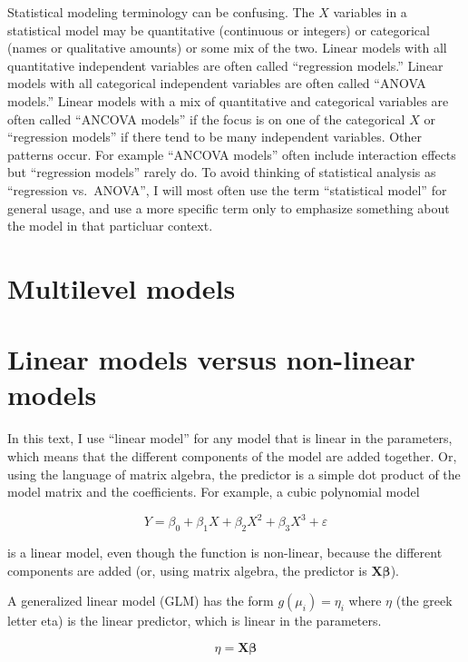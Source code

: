 \documentclass[]{book}
\theoremstyle{definition}
\theoremstyle{definition}
\theoremstyle{definition}
\theoremstyle{remark}
\begin{document}
Statistical modeling terminology can be confusing. The \(X\) variables
in a statistical model may be quantitative (continuous or integers) or
categorical (names or qualitative amounts) or some mix of the two.
Linear models with all quantitative independent variables are often
called ``regression models.'' Linear models with all categorical
independent variables are often called ``ANOVA models.'' Linear models
with a mix of quantitative and categorical variables are often called
``ANCOVA models'' if the focus is on one of the categorical \(X\) or
``regression models'' if there tend to be many independent variables.
Other patterns occur. For example ``ANCOVA models'' often include
interaction effects but ``regression models'' rarely do. To avoid
thinking of statistical analysis as ``regression vs.~ANOVA'', I will
most often use the term ``statistical model'' for general usage, and use
a more specific term only to emphasize something about the model in that
particluar context.

\section{Multilevel models}\label{multilevel-models}

\section{Linear models versus non-linear
models}\label{linear-models-versus-non-linear-models}

In this text, I use ``linear model'' for any model that is linear in the
parameters, which means that the different components of the model are
added together. Or, using the language of matrix algebra, the predictor
is a simple dot product of the model matrix and the coefficients. For
example, a cubic polynomial model

\begin{equation}
Y = \beta_0 + \beta_1 X + \beta_2 X^2 + \beta_3 X^3 + \varepsilon
\end{equation}

is a linear model, even though the function is non-linear, because the
different components are added (or, using matrix algebra, the predictor
is \(\mathbf{X}\boldsymbol{\beta}\)).

A generalized linear model (GLM) has the form \(g(\mu_i) = \eta_i\)
where \(\eta\) (the greek letter eta) is the linear predictor, which is
linear in the parameters.

\begin{equation}
\eta = \mathbf{X}\boldsymbol{\beta} 
\end{equation}
\end{document}
